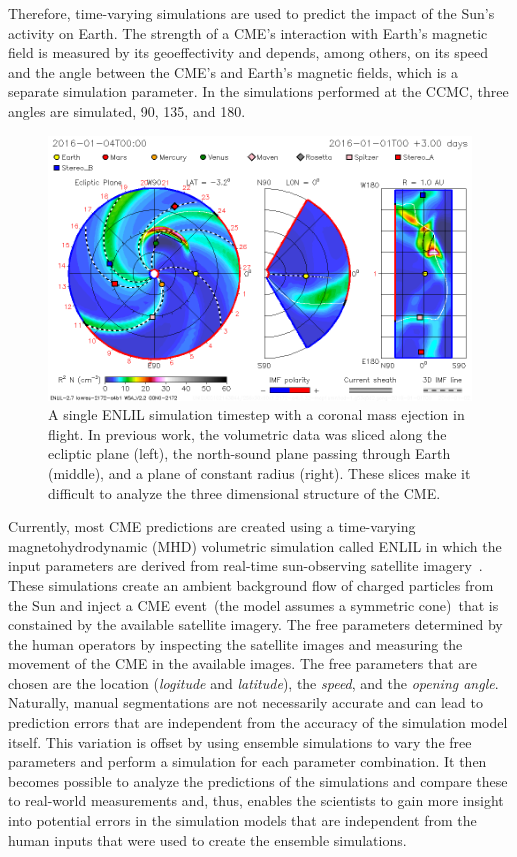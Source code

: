 Therefore, time-varying simulations are used to predict the impact of the Sun's activity on Earth.  The strength of a CME's interaction with Earth's magnetic field is measured by its geoeffectivity and depends, among others, on its speed and the angle between the CME's and Earth's magnetic fields, which is a separate simulation parameter.  In the simulations performed at the CCMC, three angles are simulated, 90\textdegree , 135\textdegree , and 180\textdegree .

\begin{figure}
\includegraphics[width=\textwidth]{figures/contributions/spaceweather/enlil.png}
\caption{A single ENLIL simulation timestep with a coronal mass ejection in flight.  In previous work, the volumetric data was sliced along the ecliptic plane (left), the north-sound plane passing through Earth (middle), and a plane of constant radius (right).  These slices make it difficult to analyze the three dimensional structure of the CME.}
\label{contributions:astro:spaceweather:enlil}
\end{figure}

Currently, most CME predictions are created using a time-varying magnetohydrodynamic (MHD) volumetric simulation called ENLIL in which the input parameters are derived from real-time sun-observing satellite imagery~\cite{mays2015ensemble}.  These simulations create an ambient background flow of charged particles from the Sun and inject a CME event~(the model assumes a symmetric cone)~that is constained by the available satellite imagery.  The free parameters determined by the human operators by inspecting the satellite images and measuring the movement of the CME in the available images.  The free parameters that are chosen are the location (\emph{logitude} and \emph{latitude}), the \emph{speed}, and the \emph{opening angle}.  Naturally, manual segmentations are not necessarily accurate and can lead to prediction errors that are independent from the accuracy of the simulation model itself.  This variation is offset by using ensemble simulations to vary the free parameters and perform a simulation for each parameter combination.  It then becomes possible to analyze the predictions of the simulations and compare these to real-world measurements and, thus, enables the scientists to gain more insight into potential errors in the simulation models that are independent from the human inputs that were used to create the ensemble simulations.

